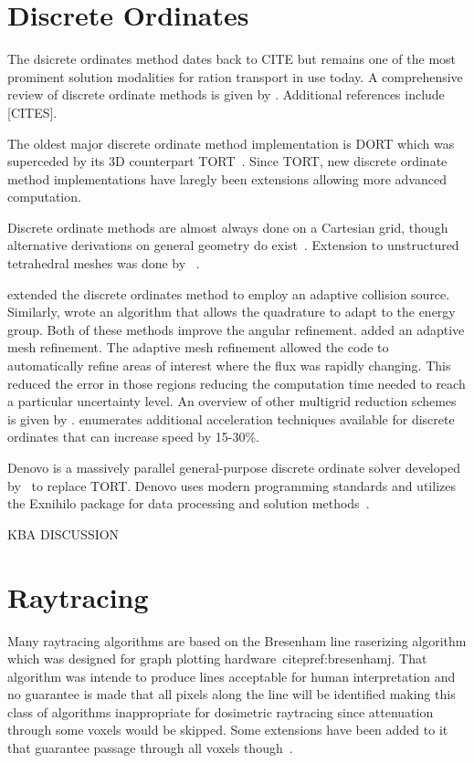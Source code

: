 \section{Discrete Ordinates}\label{sec:discordlit}
The dsicrete ordinates method dates back to CITE but remains one of the most prominent solution modalities for ration transport in use today. A comprehensive review of discrete ordinate methods is given by \citet{ref:lewise}. Additional references include [CITES].

The oldest major discrete ordinate method implementation is DORT which was superceded by its 3D counterpart TORT~\citep{ref:rhoadesw}. Since TORT, new discrete ordinate method implementations have laregly been extensions allowing more advanced computation.

Discrete ordinate methods are almost always done on a Cartesian grid, though alternative derivations on general geometry do exist~\citep{ref:dehart}. Extension to unstructured tetrahedral meshes was done by ~\citet{ref:wareingt}.

\citet{ref:waltersw} extended the discrete ordinates method to employ an adaptive collision source. Similarly, \citet{ref:ahrensc} wrote an algorithm that allows the quadrature to adapt to the energy group. Both of these methods improve the angular refinement. \citet{ref:ibrahima} added an adaptive mesh refinement. The adaptive mesh refinement allowed the code to automatically refine areas of interest where the flux was rapidly changing. This reduced the error in those regions reducing the computation time needed to reach a particular uncertainty level. An overview of other multigrid reduction schemes is given by \citet{ref:leeb}. \citet{ref:efremenkod} enumerates additional acceleration techniques available for discrete ordinates that can increase speed by 15-30\%.

Denovo is a massively parallel general-purpose discrete ordinate solver developed by~\citet{ref:evanst} to replace TORT. Denovo uses modern programming standards and utilizes the Exnihilo package for data processing and solution methods~\citep{ref:evanst2}. 

KBA DISCUSSION

\section{Raytracing}

Many raytracing algorithms are based on the Bresenham line raserizing algorithm which was designed for graph plotting hardware~citep{ref:bresenhamj}. That algorithm was intende to produce lines acceptable for human interpretation and no guarantee is made that all pixels along the line will be identified making this class of algorithms inappropriate for dosimetric raytracing since attenuation through some voxels would be skipped. Some extensions have been added to it that guarantee passage through all voxels though~\citep{ref:liuy}.

